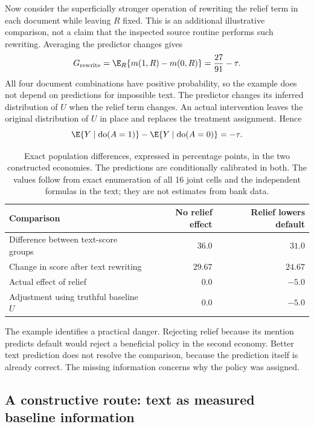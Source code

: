 Now consider the superficially stronger operation of rewriting the relief
term in each document while leaving $R$ fixed. This is an additional
illustrative comparison, not a claim that the inspected source routine
performs such rewriting. Averaging the predictor changes gives
\begin{equation}
 G_{\mathrm{rewrite}}
 =\E_R\{m(1,R)-m(0,R)\}=\frac{27}{91}-\tau.
 \label{closure30:text-rewrite}
\end{equation}
All four document combinations have positive probability, so the example
does not depend on predictions for impossible text. The predictor changes
its inferred distribution of $U$ when the relief term changes. An actual
intervention leaves the original distribution of $U$ in place and replaces
the treatment assignment. Hence
\begin{equation}
 \E\{Y\mid\operatorname{do}(A=1)\}
 -\E\{Y\mid\operatorname{do}(A=0)\}=-\tau.
 \label{closure30:text-do}
\end{equation}

\begin{table}[htbp]
\centering
\begin{tabular}{lrr}
\toprule
Comparison & No relief effect & Relief lowers default\\
\midrule
Difference between text-score groups & $36.0$ & $31.0$\\
Change in score after text rewriting & $29.67$ & $24.67$\\
Actual effect of relief & $0.0$ & $-5.0$\\
Adjustment using truthful baseline $U$ & $0.0$ & $-5.0$\\
\bottomrule
\end{tabular}
\caption{Exact population differences, expressed in percentage points, in
the two constructed economies. The predictions are conditionally calibrated
in both. The values follow from exact enumeration of all 16 joint cells and
the independent formulas in the text; they are not estimates from bank data.}
\label{closure30:text-results}
\end{table}

The example identifies a practical danger. Rejecting relief because its
mention predicts default would reject a beneficial policy in the second
economy. Better text prediction does not resolve the comparison, because
the prediction itself is already correct. The missing information concerns
why the policy was assigned.

\subsection{A constructive route: text as measured baseline information}

